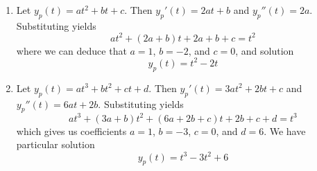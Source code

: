 \documentclass[a4paper]{article}
\begin{document}
\begin{enumerate}[label=(\alph*)]
	\item Let \( y_{p } \!\left( t  \right) = at^{2} + bt + c  \). Then \( y_{p}'\!\left( t \right) = 2at + b  \) and \( y_{p }''\!\left( t  \right) = 2a \). Substituting yields
	\[
		at^{2} + \!\left( 2a + b  \right)t + 2a + b + c = t^{2} 
	\]
	where we can deduce that \( a = 1 \), \( b = -2 \), and \( c = 0 \), and solution
	\[
		y_{p } \!\left( t  \right) = t^{2} - 2t
	\]
	\item Let \( y_{p } \!\left( t  \right) = at^{3} + bt^{2} + ct + d  \). Then \( y_{p }'\!\left( t  \right) = 3at^{2} + 2bt + c  \) and \( y_{p }''\!\left( t  \right) = 6at + 2b \). Substituting yields
	\[
		 at^{3} + \!\left( 3a + b  \right)t^{2} + \!\left( 6a + 2b + c  \right)t + 2b + c + d = t^{3}
	\]
	which gives us coefficients \( a = 1 \), \( b = -3 \), \( c = 0 \), and \( d = 6 \). We have particular solution
	\[
		y_{p } \!\left( t  \right) = t^{3} - 3t^{2} + 6 
	\]
\end{enumerate}

\end{document}
